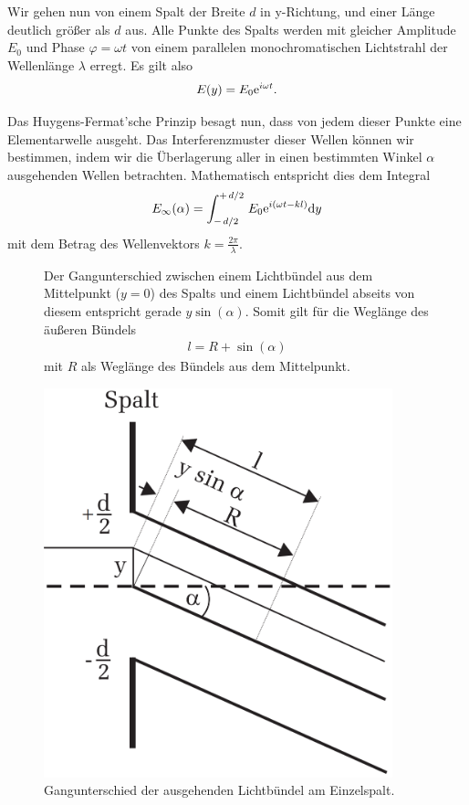 Wir gehen nun von einem Spalt der Breite $d$ in y-Richtung, und einer Länge deutlich größer als $d$ aus. Alle Punkte des Spalts werden mit gleicher Amplitude $E_0$ und Phase $\varphi = \omega t$ von einem parallelen monochromatischen Lichtstrahl der Wellenlänge $\lambda$ erregt. Es gilt also
\begin{align}
  E(y) = E_0 \text{e}^{i\omega t}.
\end{align}

Das Huygens-Fermat'sche Prinzip besagt nun, dass von jedem dieser Punkte eine Elementarwelle ausgeht. Das Interferenzmuster dieser Wellen können wir bestimmen, indem wir die Überlagerung aller in einen bestimmten Winkel $\alpha$ ausgehenden Wellen betrachten. Mathematisch entspricht dies dem Integral
\begin{align}
    E_{\infty}(\alpha) = \int_{-\flatfrac{d}{2}}^{+\flatfrac{d}{2}} E_0 \e{i(\omega t - kl)} \dd y
\end{align}
mit dem Betrag des Wellenvektors $k = \frac{2\pi}{\lambda}$. 

\begin{figure}[H]
  \centering
  \begin{minipage}{0.65\textwidth}
    Der Gangunterschied zwischen einem Lichtbündel aus dem Mittelpunkt ($y = 0$) des Spalts und einem Lichtbündel abseits von diesem entspricht gerade $y \sin(\alpha)$. Somit gilt für die Weglänge des äußeren Bündels
    \begin{align}
      l = R + \sin(\alpha)
    \end{align}
    mit $R$ als Weglänge des Bündels aus dem Mittelpunkt. 
  \end{minipage}\hfill
  \begin{minipage}{0.3\textwidth}
      \centering
      \includegraphics[width=0.9\textwidth]{files/gangunterschied_fraunhofer_einzelspalt.png}
      \caption{Gangunterschied der ausgehenden Lichtbündel am Einzelspalt.}
      \label{fig:gangunterschied_fraunhofer_einzelspalt}
  \end{minipage}
\end{figure}



